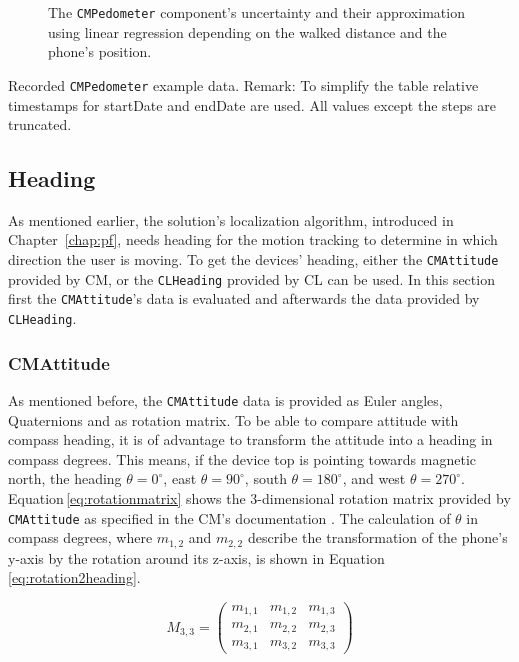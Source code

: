 \begin{figure}
  
  \caption {The \texttt{CMPedometer} component's uncertainty and their approximation using linear regression depending on the walked distance and the phone's position.}
  \label{fig:eval:pedometerNDF}
\end{figure}

\begin{table}
	
	\caption{Recorded \texttt{CMPedometer} example data. Remark: To simplify the table relative timestamps for startDate and endDate are used. All values except the steps are truncated.}
	\label{tab:pedometerEvaluation}
\end{table}


\subsection{Heading}
As mentioned earlier, the solution's localization algorithm, introduced in Chapter~\ref{chap:pf}, needs heading for the motion tracking to determine in which direction the user is moving. To get the devices' heading, either the \texttt{CMAttitude} provided by \ac{CM}, or the \texttt{CLHeading} provided by \ac{CL} can be used. In this section first the \texttt{CMAttitude}'s data is evaluated and afterwards the data provided by \texttt{CLHeading}.

\subsubsection*{CMAttitude}
As mentioned before, the \texttt{CMAttitude} data is provided as Euler angles, Quaternions and as rotation matrix. To be able to compare attitude with compass heading, it is of advantage to transform the attitude into a heading in compass degrees. This means, if the device top is pointing towards magnetic north, the heading $\theta = 0^{\circ}$, east $\theta = 90^{\circ}$, south $\theta = 180^{\circ}$, and west $\theta = 270^{\circ}$. Equation\,\ref{eq:rotationmatrix} shows the 3-dimensional rotation matrix provided by \texttt{CMAttitude} as specified in the \ac{CM}'s documentation \citep{apple:ios_doc_cm}. The calculation of $\theta$ in compass degrees, where $m_{1,2}$ and $m_{2,2}$ describe the transformation of the phone's y-axis by the rotation around its z-axis, is shown in Equation\,\ref{eq:rotation2heading}.

\begin{equation} \label{eq:rotationmatrix}
  M_{3,3} = \begin{pmatrix}
      m_{1,1} & m_{1,2} & m_{1,3} \\
      m_{2,1} & m_{2,2} & m_{2,3} \\
      m_{3,1} & m_{3,2} & m_{3,3}
  \end{pmatrix}
\end{equation}

